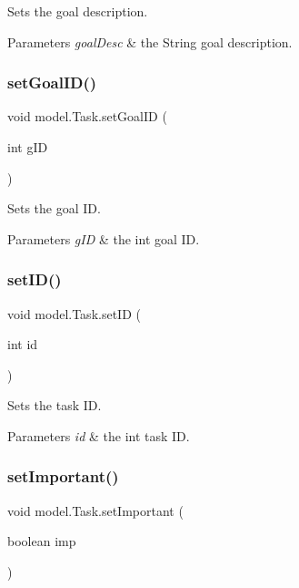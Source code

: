 Sets the goal description. 
\begin{DoxyParams}{Parameters}
{\em goal\+Desc} & the String goal description. \\
\hline
\end{DoxyParams}
\mbox{\label{classmodel_1_1_task_a75cabc2acb75bf8cc6af9284a76233ff}} 
\subsubsection{set\+Goal\+I\+D()}
{\footnotesize\ttfamily void model.\+Task.\+set\+Goal\+ID (\begin{DoxyParamCaption}\item[{int}]{g\+ID }\end{DoxyParamCaption})\hspace{0.3cm}{\ttfamily [private]}}

Sets the goal ID. 
\begin{DoxyParams}{Parameters}
{\em g\+ID} & the int goal ID. \\
\hline
\end{DoxyParams}
\mbox{\label{classmodel_1_1_task_a520920ed7703ae56b87d7385f467c814}} 
\subsubsection{set\+I\+D()}
{\footnotesize\ttfamily void model.\+Task.\+set\+ID (\begin{DoxyParamCaption}\item[{int}]{id }\end{DoxyParamCaption})\hspace{0.3cm}{\ttfamily [private]}}

Sets the task ID. 
\begin{DoxyParams}{Parameters}
{\em id} & the int task ID. \\
\hline
\end{DoxyParams}
\mbox{\label{classmodel_1_1_task_ae8f43d30c36bc450cf763b76b385e815}} 
\subsubsection{set\+Important()}
{\footnotesize\ttfamily void model.\+Task.\+set\+Important (\begin{DoxyParamCaption}\item[{boolean}]{imp }\end{DoxyParamCaption})\hspace{0.3cm}{\ttfamily [private]}}

